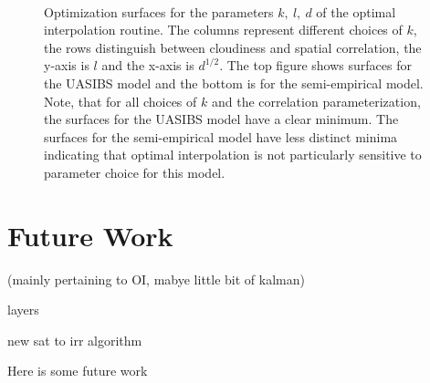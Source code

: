 \begin{figure}[p]
\centering
\captionsetup[subfigure]{labelformat=empty}
\vspace{-1em} \\
\caption[Optimization surfaces for OI parameters]{Optimization
  surfaces for the parameters $k,\: l,\: d$ of the optimal
  interpolation routine. The columns represent different choices of
  $k$, the rows distinguish between cloudiness and spatial
  correlation, the y-axis is $l$ and the x-axis is $d^{1/2}$. The top
  figure shows surfaces for the UASIBS model and the bottom is for the
  semi-empirical model. Note, that for all choices of $k$ and the
  correlation parameterization, the surfaces for the UASIBS model have
  a clear minimum. The surfaces for the semi-empirical model have less
  distinct minima indicating that optimal interpolation is not
  particularly sensitive to parameter choice for this model.}
\label{fig:paramopt}
\end{figure}

\section{Future Work}
(mainly pertaining to OI, mabye little bit of kalman)

layers

new sat to irr algorithm

Here is some future work

